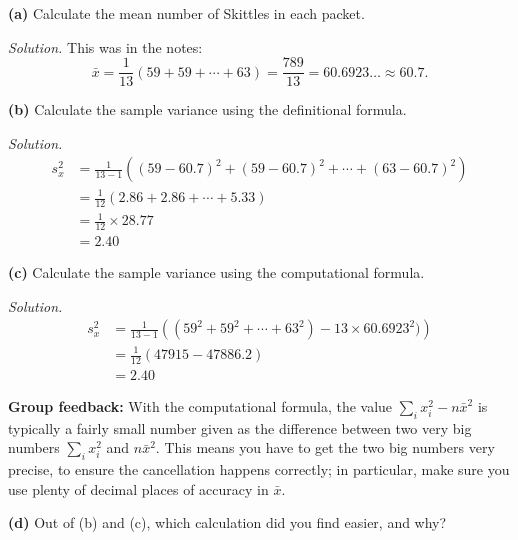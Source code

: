 \documentclass[
  a4paper,
]{book}
\theoremstyle{definition}
\theoremstyle{definition}
\theoremstyle{definition}
\theoremstyle{definition}
\theoremstyle{remark}
\begin{document}
\textbf{(a)} Calculate the mean number of Skittles in each packet.

\begin{myanswers}
\emph{Solution.} This was in the notes:
\[ \bar x = \frac{1}{13} (59 + 59 + \cdots + 63) =  \frac{789}{13} = 60.6923\dots \approx 60.7 .\]

\end{myanswers}

\textbf{(b)} Calculate the sample variance using the definitional
formula.

\begin{myanswers}
\emph{Solution.}
\begin{align*}
s_x^2 &= \frac{1}{13 - 1} \left( (59 - 60.7)^2 + (59 - 60.7)^2 + \cdots + (63 - 60.7)^2 \right) \\
      &= \frac{1}{12} (2.86 + 2.86 + \cdots + 5.33) \\
      &= \frac{1}{12} \times 28.77 \\
      &= 2.40
\end{align*}

\end{myanswers}

\textbf{(c)} Calculate the sample variance using the computational formula.

\begin{myanswers}
\emph{Solution.}
\begin{align*}
s_x^2 &= \frac{1}{13 - 1} \left( (59^2 + 59^2 + \cdots + 63^2) - 13 \times 60.6923^2)\right) \\
      &= \frac{1}{12} (47915 - 47886.2) \\
      &= 2.40
\end{align*}

\textbf{Group feedback:} With the computational formula, the value \(\sum_i x_i^2 - n \bar{x}^2\) is typically a fairly small number given as the difference between two very big numbers \(\sum_i x_i^2\) and \(n \bar x^2\). This means you have to get the two big numbers very precise, to ensure the cancellation happens correctly; in particular, make sure you use plenty of decimal places of accuracy in \(\bar x\).

\end{myanswers}

\textbf{(d)} Out of (b) and (c), which calculation did you find easier, and why?
\end{document}
